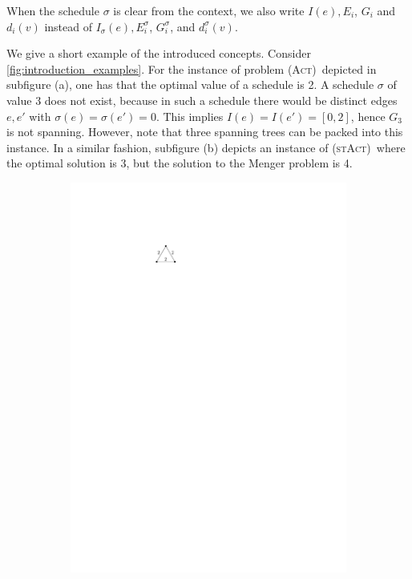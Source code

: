 \documentclass[runningheads]{llncs}
\numberwithin{equation}{section}
\newcommand{\act}{\textsc{(Act)}}
\newcommand{\stact}{\textsc{(stAct)}}
\begin{document}
When the schedule $\sigma$ is clear from the context, we also write $I(e), E_i$, $G_i$ and $d_i(v)$ instead of $I_\sigma(e), E^\sigma_i$, $G^\sigma_i$, and $d^\sigma_i(v)$. 

We give a short example of the introduced concepts. Consider \cref{fig:introduction_examples}. For the instance of problem \act\ depicted in subfigure (a), one has that the optimal value of a schedule is 2. A schedule $\sigma$ of value 3 does not exist, because in such a schedule there would be distinct edges $e, e'$ with $\sigma(e) = \sigma(e') = 0$. This implies $I(e) = I(e') = [0, 2]$, hence $G_3$ is not spanning. However, note that three spanning trees can be packed into this instance. In a similar fashion, subfigure (b) depicts an instance of \stact\ where the optimal solution is 3, but the solution to the Menger problem is 4.
\begin{figure}
     \centering
     \begin{subfigure}[t]{0.3\textwidth}
         \centering
         \includegraphics[scale=1]{img/example-act}

\end{subfigure}
\end{figure}
\end{document}
